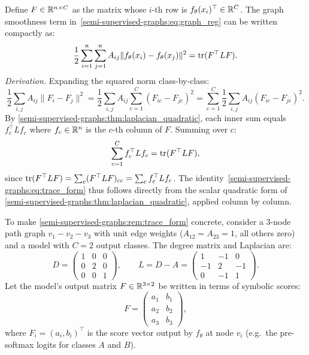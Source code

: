 \begin{notechapter}
\begin{remark}
\label{semi-supervised-graphs:rem:trace_form}
Define $F \in \mathbb{R}^{n \times C}$ as the matrix whose $i$-th row is
$f_\theta(x_i)^\top \in \mathbb{R}^C$. The graph smoothness term in~\eqref{semi-supervised-graphs:eq:graph_reg}
can be written compactly as:
\begin{equation}
\label{semi-supervised-graphs:eq:trace_form}
\frac{1}{2}\sum_{i=1}^n\sum_{j=1}^n A_{ij}\|f_\theta(x_i) - f_\theta(x_j)\|^2
= \operatorname{tr}(F^\top L F).
\end{equation}
\emph{Derivation.} Expanding the squared norm class-by-class:
\[
\frac{1}{2}\sum_{i,j}A_{ij}\|F_i - F_j\|^2
= \frac{1}{2}\sum_{i,j}A_{ij}\sum_{c=1}^C(F_{ic}-F_{jc})^2
= \sum_{c=1}^C \frac{1}{2}\sum_{i,j}A_{ij}(F_{ic}-F_{jc})^2.
\]
By \cref{semi-supervised-graphs:thm:laplacian_quadratic}, each inner sum equals $f_c^\top L f_c$
where $f_c \in \mathbb{R}^n$ is the $c$-th column of $F$. Summing over $c$:
\[
\sum_{c=1}^C f_c^\top L f_c = \operatorname{tr}(F^\top L F),
\]
since $\operatorname{tr}(F^\top L F) = \sum_c (F^\top L F)_{cc} = \sum_c f_c^\top L f_c$. The
identity~\eqref{semi-supervised-graphs:eq:trace_form} thus follows directly from the scalar quadratic
form of \cref{semi-supervised-graphs:thm:laplacian_quadratic}, applied column by column.
\end{remark}

\begin{example}
\label{semi-supervised-graphs:ex:trace_form_symbolic}
To make \cref{semi-supervised-graphs:rem:trace_form} concrete, consider a 3-node path graph
$v_1 - v_2 - v_3$ with unit edge weights ($A_{12} = A_{23} = 1$, all others
zero) and a model with $C = 2$ output classes. The degree matrix and Laplacian
are:
\[
D = \begin{pmatrix} 1 & 0 & 0 \\ 0 & 2 & 0 \\ 0 & 0 & 1 \end{pmatrix}, \qquad
L = D - A = \begin{pmatrix} 1 & -1 & 0 \\ -1 & 2 & -1 \\ 0 & -1 & 1 \end{pmatrix}.
\]
Let the model's output matrix $F \in \mathbb{R}^{3 \times 2}$ be written in terms of
symbolic scores:
\[
F = \begin{pmatrix} a_1 & b_1 \\ a_2 & b_2 \\ a_3 & b_3 \end{pmatrix},
\]
where $F_i = (a_i, b_i)^\top$ is the score vector output by $f_\theta$ at node
$v_i$ (e.g.\ the pre-softmax logits for classes $A$ and $B$).


\end{example}
\end{notechapter}
